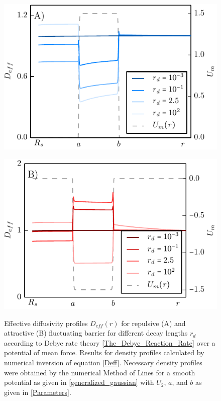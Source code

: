 \begin{minipage}[t]{.5 \textwidth}
    \begin{figure}[H]
        \includegraphics[width = 1 \textwidth]{plots/repulsive_mapping_d.pdf}
    \end{figure}
\end{minipage}\begin{minipage}[t]{.5 \textwidth}
    \begin{figure}[H]
        \includegraphics[width = 1 \textwidth]{plots/attractive_mapping_d.pdf}
    \end{figure}
\end{minipage}

\begin{minipage}[t]{1 \textwidth}
    \begin{figure}[H]
        \caption{Effective diffusivity profiles $D_{eff}(r)$ for repulsive (A) and attractive (B) fluctuating barrier for different decay lengths $r_d$ according to Debye rate theory \ref{The_Debye_Reaction_Rate} over a potential of mean force. Results for density profiles calculated by numerical inversion of equation \eqref{Deff}. Necessary density profiles were obtained by the numerical Method of Lines for a smooth potential as given in \eqref{generalized_gaussian} with $U_2$, $a$, and $b$ as given in \eqref{Parameters}.}
    \end{figure}
\end{minipage} \vspace{0.5 cm} \\


